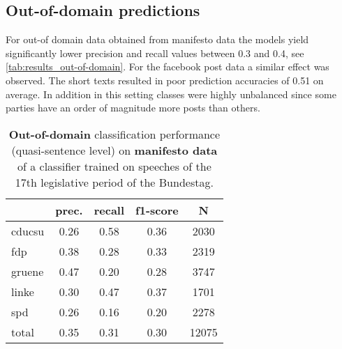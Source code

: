\documentclass[11pt]{article}
\begin{document}
\subsection{Out-of-domain predictions}
For out-of domain data obtained from manifesto data the models yield significantly lower precision and recall values between 0.3 and 0.4, see \autoref{tab:results_out-of-domain}. For the facebook post data a similar effect was observed. The short texts resulted in poor prediction accuracies of 0.51 on average. In addition in this setting classes were highly unbalanced since some parties have an order of magnitude more posts than others. 


\begin{table}[t]
\caption{
\label{tab:results_out-of-domain}
{\bf Out-of-domain} classification performance (quasi-sentence level) on {\bf manifesto data} of a classifier trained on speeches of the 17th legislative period of the Bundestag.
}

\begin{center}
\begin{tabular}{lcccc}
    &         prec.    &recall &  f1-score  & N  \\
\hline \hline
    cducsu    &   0.26   &   0.58   &   0.36    &   2030 \\
    fdp    &   0.38   &   0.28   &   0.33    &   2319 \\
     gruene   &    0.47    &  0.20   &   0.28    &  3747\\
      linke     &  0.30  &    0.47    &  0.37    &   1701\\
        spd     &  0.26  &    0.16   &   0.20    &   2278\\
\hline
total    &   0.35  &    0.31  &    0.30   &   12075\\
%
\end{tabular}
\end{center}

\end{table}
\end{document}
